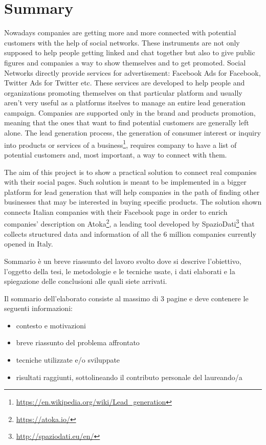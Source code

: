 \chapter*{Summary} %
\label{Summary}




Nowadays companies are getting more and more connected with potential customers with the help of social networks. These instruments are not only supposed to help people getting linked and chat together but also to give public figures and companies a way to show themselves and to get promoted. Social Networks directly provide services for advertisement: Facebook Ads for Facebook, Twitter Ads for Twitter etc. These services are developed to help people and organizations promoting themselves on that particular platform and usually aren't very useful as a platforms itselves to manage an entire lead generation campaign. Companies are supported only in the brand and products promotion, meaning that the ones that want to find potential customers are generally left alone. The lead generation process, the generation of consumer interest or inquiry into products or services of a business\footnote{\url{https://en.wikipedia.org/wiki/Lead\_generation}}, requires company to have a list of potential customers and, most important, a way to connect with them.
\bigskip


The aim of this project is to show a practical solution to connect real companies with their social pages. Such solution is meant to be implemented in a bigger platform for lead generation that will help companies in the path of finding other businesses that may be interested in buying specific products. The solution shown connects Italian companies with their Facebook page in order to enrich companies' description on Atoka\footnote{\url{https://atoka.io/}}, a leading tool developed by SpazioDati\footnote{\url{http://spaziodati.eu/en/}} that collects structured data and information of all the 6 million companies currently opened in Italy.


  Sommario è un breve riassunto del lavoro svolto dove si descrive l'obiettivo, l'oggetto della tesi, le 
metodologie e le tecniche usate, i dati elaborati e la spiegazione delle conclusioni alle quali siete arrivati.  

Il sommario dell’elaborato consiste al massimo di 3 pagine e deve contenere le seguenti informazioni:
\begin{itemize}
  \item contesto e motivazioni 
  \item breve riassunto del problema affrontato
  \item tecniche utilizzate e/o sviluppate
  \item risultati raggiunti, sottolineando il contributo personale del laureando/a
\end{itemize}




